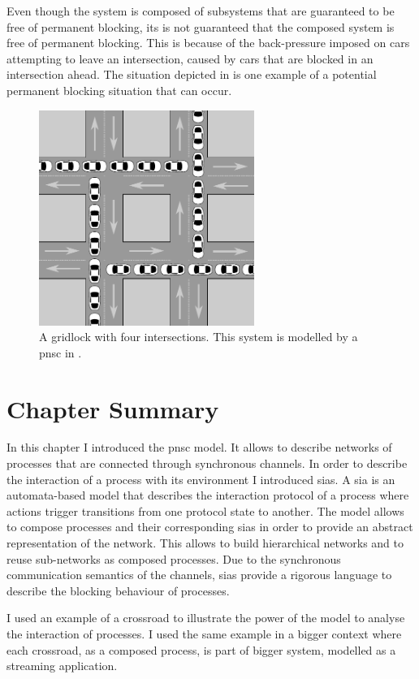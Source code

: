 Even though the system is composed of subsystems that are guaranteed to be free of permanent blocking, its is not guaranteed that the composed system is free of permanent blocking.
This is because of the back-pressure imposed on cars attempting to leave an intersection, caused by cars that are blocked in an intersection ahead.
The situation depicted in \Fig{\ref{fig_cross_buf}} is one example of a potential permanent blocking situation that can occur.
\begin{figure}[bht]
    \TopFigSpace
    \centering
    \includegraphics[width=7cm]{fig/cross_buf.pdf}
    \CaptionFigSpace
    \caption{A gridlock with four intersections. This system is modelled by a \gls{pnsc} in \Fig{\ref{fig_cross_procs_dl}}.}
    \label{fig_cross_buf}
    \BotFigSpace
\end{figure}

\section{Chapter Summary}
\label{sect_ecm_summary}
In this chapter I introduced the \gls{pnsc} model.
It allows to describe networks of processes that are connected through synchronous channels.
In order to describe the interaction of a process with its environment I introduced \glspl{sia}.
A \gls{sia} is an automata-based model that describes the interaction protocol of a process where actions trigger transitions from one protocol state to another.
The model allows to compose processes and their corresponding \glspl{sia} in order to provide an abstract representation of the network.
This allows to build hierarchical networks and to reuse sub-networks as composed processes.
Due to the synchronous communication semantics of the channels, \glspl{sia} provide a rigorous language to describe the blocking behaviour of processes.

I used an example of a crossroad to illustrate the power of the model to analyse the interaction of processes.
I used the same example in a bigger context where each crossroad, as a composed process, is part of bigger system, modelled as a streaming application.
